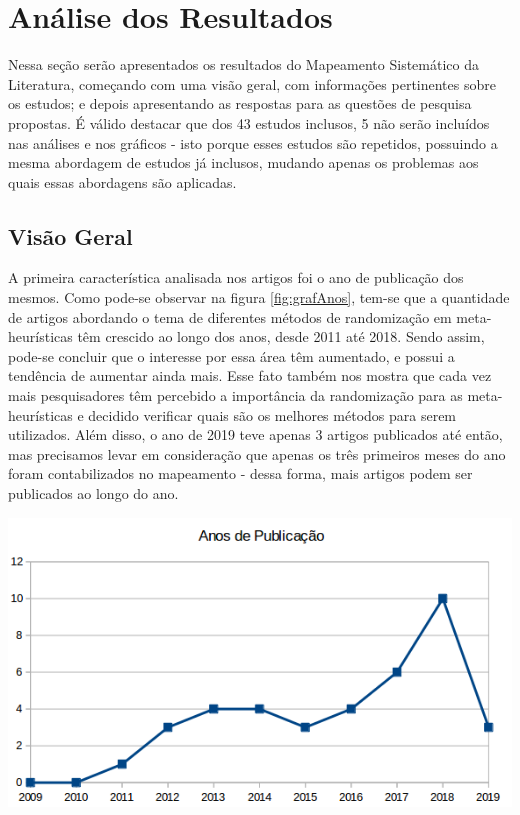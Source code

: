 \section{Análise dos Resultados}
\label{sec:analise}

Nessa seção serão apresentados os resultados do Mapeamento Sistemático da Literatura, começando com uma visão geral, com informações pertinentes sobre os estudos; e depois apresentando as respostas para as questões de pesquisa propostas. É válido destacar que dos 43 estudos inclusos, 5 não serão incluídos nas análises e nos gráficos - isto porque esses estudos são repetidos, possuindo a mesma abordagem de estudos já inclusos, mudando apenas os problemas aos quais essas abordagens são aplicadas.


\nocite{*}


\subsection{Visão Geral}

A primeira característica analisada nos artigos foi o ano de publicação dos mesmos. Como pode-se observar na figura \ref{fig:grafAnos}, tem-se que a quantidade de artigos abordando o tema de diferentes métodos de randomização em meta-heurísticas têm crescido ao longo dos anos, desde 2011 até 2018. Sendo assim, pode-se concluir que o interesse por essa área têm aumentado, e possui a tendência de aumentar ainda mais. Esse fato também nos mostra que cada vez mais pesquisadores têm percebido a importância da randomização para as meta-heurísticas e decidido verificar quais são os melhores métodos para serem utilizados. Além disso, o ano de 2019 teve apenas 3 artigos publicados até então, mas precisamos levar em consideração que apenas os três primeiros meses do ano foram contabilizados no mapeamento - dessa forma, mais artigos podem ser publicados ao longo do ano.

{
    \centering
    \includegraphics[width=0.7\linewidth]{figuras/graficoAnos.png}
    \label{fig:grafAnos}
}

